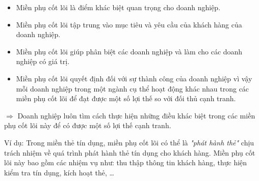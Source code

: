 








\begin{itemize}
    \item      Miền phụ cốt lõi là điểm khác biệt quan trọng cho doanh nghiệp.
    \item      Miền phụ cốt lõi tập trung vào mục tiêu và yêu cầu của khách hàng của doanh nghiệp.
    \item      Miền phụ cốt lõi giúp phân biệt các doanh nghiệp và làm cho các doanh nghiệp có giá trị.
    \item      Miền phụ cốt lõi quyết định đối với sự thành công của doanh nghiệp vì vậy mỗi doanh nghiệp trong một ngành cụ thể hoạt động khác nhau trong các miền phụ cốt lõi để đạt được một số lợi thế so với đối thủ cạnh tranh.

\end{itemize}



$\Rightarrow$ Doanh nghiệp luôn tìm cách thực hiện những điều khác biệt trong các miền phụ cốt lõi này để có được một số lợi thế cạnh tranh.

Ví dụ: Trong miền thẻ tín dụng, miền phụ cốt lõi có thể là \textit{"phát hành thẻ"} chịu trách nhiệm về quá trình phát hành thẻ tín dụng cho khách hàng. Miền phụ cốt lõi này bao gồm các nhiệm vụ như: thu thập thông tin khách hàng, thực hiện kiểm tra tín dụng, kích hoạt thẻ, \dots


